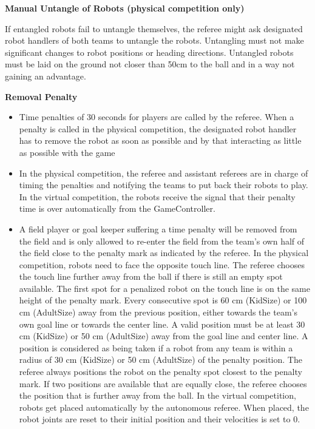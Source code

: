 \bigskip

{\bfseries Manual Untangle of Robots (physical competition only)}

If entangled robots fail to untangle themselves, the referee might ask designated robot handlers of both teams to untangle the robots. Untangling must not make
significant changes to robot positions or heading directions. Untangled robots must be laid on the ground not closer than 50cm to the ball and in a way not gaining an advantage.

\bigskip


{\bfseries Removal Penalty}

\begin{itemize}
\item Time penalties of 30 seconds for players are called by the referee. When a penalty is called in the physical competition, the designated robot handler has to remove the robot as soon as possible and by that interacting as little as possible with the game
\item In the physical competition, the referee and assistant referees are in charge of timing the penalties and notifying the teams to put back their robots to play. In the virtual competition, the robots receive the signal that their penalty time is over automatically from the GameController.
\item A field player or goal keeper suffering a time penalty will be
  removed from the field and is only allowed to re-enter
  the field from the team's own half of the field close to the penalty mark
  as indicated by the referee. In the physical competition, robots need to face the opposite touch line.
  The referee chooses the touch line further away from the ball if there
    is still an empty spot available. The first spot for a penalized robot on
    the touch line is on the same height of the penalty mark. Every consecutive
    spot is 60 cm (KidSize) or 100 cm (AdultSize) away from the previous
    position, either towards the team's own goal line or towards the center
    line. A valid position must be at least 30 cm (KidSize) or 50 cm (AdultSize)
    away from the goal line and center line. A position is considered as being
    taken if a robot from any team is within a radius of 30 cm (KidSize) or 50
    cm (AdultSize) of the penalty position. The referee always positions the
    robot on the penalty spot closest to the penalty mark. If two positions are
    available that are equally close, the referee chooses the position that is
    further away from the ball.
    In the virtual competition, robots get placed automatically by the autonomous referee. When placed, the robot joints are reset to their initial position and their
    velocities is set to 0.


\end{itemize}

